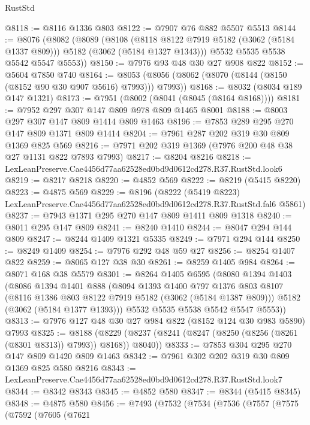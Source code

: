 \begin{lexlean}{RustStd}
\begin{coremodule}
@8118 := @8116 @1336 @803
@8122 := @7907 @76 @882 @5507 @5513
@8144 := @8076
    (@8082
      (@8089
        (@8108
          (@8118 @8122 @7919 @5182 (@3062 (@5184 @1337 @809)))
          @5182
          (@3062 (@5184 @1327 @1343)))
        @5532
        @5535
        @5538
        @5542
        @5547
        @5553))
@8150 := @7976 @93 @48 @30 @27 @908 @822
@8152 := @5604 @7850 @740
@8164 := @8053 (@8056 (@8062 (@8070 (@8144 (@8150 (@8152 @90 @30 @907 @5616) @7993))) @7993))
@8168 := @8032 (@8034 @189 @147 @1321)
@8173 := @7951 (@8002 (@8041 (@8045 (@8164 @8168))))
@8181 := @7952 @297 @307 @147 @809 @978 @809 @1465 @8001
@8188 := @8003 @297 @307 @147 @809 @1414 @809 @1463
@8196 := @7853 @289 @295 @270 @147 @809 @1371 @809 @1414
@8204 := @7961 @287 @202 @319 @30 @809 @1369 @825 @569
@8216 := @7971 @202 @319 @1369 (@7976 @200 @48 @38 @27 @1131 @822 @7893 @7993)
@8217 := @8204 @8216
@8218 := LexLeanPreserve.Cae4456d77aa62528ed0bd9d0612cd278.R37.RustStd.look6
@8219 := @8217 @8218
@8220 := @4852 @569
@8222 := @8219 (@5415 @8220)
@8223 := @4875 @569
@8229 := @8196
    (@8222 (@5419 @8223) LexLeanPreserve.Cae4456d77aa62528ed0bd9d0612cd278.R37.RustStd.fal6 @5861)
@8237 := @7943 @1371 @295 @270 @147 @809 @1411 @809 @1318
@8240 := @8011 @295 @147 @809
@8241 := @8240 @1410
@8244 := @8047 @294 @144 @809
@8247 := @8244 @1409 @1321 @5335
@8249 := @7971 @294 @144
@8250 := @8249 @1409
@8254 := @7976 @292 @48 @59 @27
@8256 := @8254 @1407 @822
@8259 := @8065 @127 @38 @30
@8261 := @8259 @1405 @984
@8264 := @8071 @168 @38 @5579
@8301 := @8264
    @1405
    @6595
    (@8080
      @1394
      @1403
      (@8086
        @1394
        @1401
        @888
        (@8094
          @1393
          @1400
          @797
          @1376
          @803
          @8107
          (@8116 @1386 @803 @8122 @7919 @5182 (@3062 (@5184 @1387 @809)))
          @5182
          (@3062 (@5184 @1377 @1393)))
        @5532
        @5535
        @5538
        @5542
        @5547
        @5553))
@8313 := @7976 @127 @48 @30 @27 @984 @822 (@8152 @124 @30 @983 @5890) @7993
@8325 := @8188
    (@8229 (@8237 (@8241 (@8247 (@8250 (@8256 (@8261 (@8301 @8313)) @7993)) @8168)) @8040))
@8333 := @7853 @304 @295 @270 @147 @809 @1420 @809 @1463
@8342 := @7961 @302 @202 @319 @30 @809 @1369 @825 @580 @8216
@8343 := LexLeanPreserve.Cae4456d77aa62528ed0bd9d0612cd278.R37.RustStd.look7
@8344 := @8342 @8343
@8345 := @4852 @580
@8347 := @8344 (@5415 @8345)
@8348 := @4875 @580
@8456 := @7493
    (@7532
      (@7534
        (@7536
          (@7557
            (@7575
              (@7592
                (@7605
                  (@7621

\end{coremodule}
\end{lexlean}
